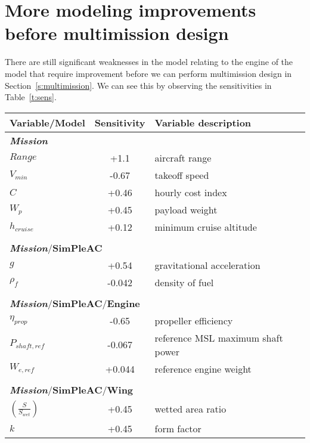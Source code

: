 \section{More modeling improvements before multimission design}

There are still significant weaknesses in the model relating to the engine of the model that require
improvement before we can perform multimission design in Section~\ref{s:multimission}.
We can see this by observing the sensitivities in Table~\ref{t:sens}.

    \begin{table}
        \footnotesize
        \centering
        \begin{tabular}{l c l}
            \toprule
            Variable/Model & Sensitivity & Variable description \\ \midrule
            \multicolumn{3}{l}{\textit{\textbf{Mission}}} \\
            $Range$ & +1.1 & aircraft range \\
            $V_{min}$ & -0.67 & takeoff speed \\
            $C$ & +0.46 & hourly cost index \\
            $W_p$ & +0.45 & payload weight \\
            $h_{cruise}$ & +0.12 & minimum cruise altitude \\
            & & \\
            \multicolumn{3}{l}{\textit{\textbf{Mission}}/\textbf{SimPleAC}} \\
            $g$ & +0.54 & gravitational acceleration \\
            $\rho_f$ & -0.042 & density of fuel \\
            & & \\
            \multicolumn{3}{l}{\textit{\textbf{Mission}}/\textbf{SimPleAC}/\textbf{Engine}} \\
            $\eta_{prop}$ & -0.65 & propeller efficiency \\
            $P_{shaft,ref}$ & -0.067 & reference MSL maximum shaft power \\
            $W_{e,ref}$ & +0.044 & reference engine weight \\
            & & \\
            \multicolumn{3}{l}{\textit{\textbf{Mission}}/\textbf{SimPleAC}/\textbf{Wing}} \\
            $(\frac{S}{S_{wet}})$ & +0.45 & wetted area ratio \\
            $k$ & +0.45 & form factor \\

\end{tabular}
\end{table}
